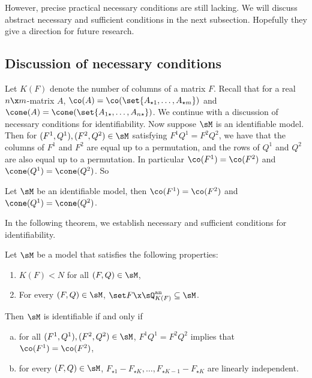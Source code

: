 \documentclass[12pt,a4paper]{article}
\begin{document}
However, precise practical necessary conditions are still lacking. We will discuss abstract necessary and sufficient conditions in the next subsection. Hopefully they give a direction for future research. 

\subsection{Discussion of necessary conditions}

Let $K(F)$ denote the number of columns of a matrix $F$. Recall that for a real  $n\x m$-matrix $A$, $\co(A)=\co(\set{A_{\star1},\ldots, A_{\star m}})$ and $\cone(A)=\cone(\set{A_{1\star},\ldots,A_{n\star}})$.
We continue with a discussion of necessary conditions for identifiability. Now suppose $\sM$ is an identifiable model. Then for $(F^1,Q^1),(F^2,Q^2)\in \sM$ satisfying $F^1Q^1=F^2Q^2$, we have that the columns of $F^1$ and $F^2$ are equal up to a permutation, and the rows of $Q^1$ and $Q^2$ are also equal up to a permutation. In particular $\co(F^1)=\co(F^2)$ and $\cone(Q^1)=\cone(Q^2)$.  So 
\begin{theorem}\label{thm:identfiabilitynecessaryconditions}
    Let $\sM$ be an identifiable model, then $\co(F^1)=\co(F^2)$ and $\cone(Q^1)=\cone(Q^2)$.
\end{theorem}
In the following theorem, we establish necessary and sufficient conditions for identifiability. 
\begin{theorem}
    Let $\sM$ be a model that satisfies the following properties: 
    \begin{enumerate}[(1)]
    \item $K(F)<N$ for all $(F,Q)\in \sM$, 
    \item For every $(F,Q)\in \sM$, $\set F\x \sQ_{K(F)}^{\text{an}}\subseteq \sM$.     
    \end{enumerate}
    Then $\sM$ is identifiable if and only if 
    \begin{enumerate}[(a)]
        \item for all $(F^1,Q^1),(F^2,Q^2)\in \sM$, $F^1Q^1=F^2Q^2$ implies that $\co(F^1)=\co(F^2)$, 
        \item for every $(F,Q)\in \sM$, $F_{\star 1}-F_{\star K},\ldots,F_{\star K-1}-F_{\star K}$ are linearly independent. 
    \end{enumerate}
\end{theorem}
\end{document}
